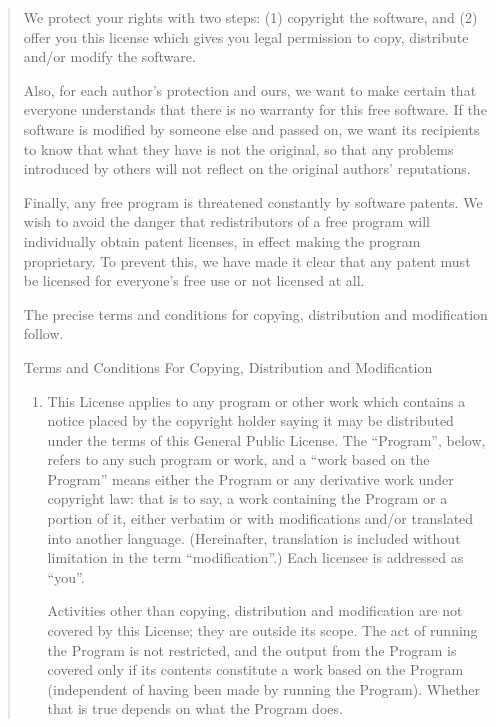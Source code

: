 \documentclass[twoside,11pt]{article}
\renewcommand{\_}{\texttt{\symbol{95}}}
\begin{document}
\begin{quote}
We protect your rights with two steps: (1) copyright the software, and (2)
offer you this license which gives you legal permission to copy,
distribute and/or modify the software.

Also, for each author's protection and ours, we want to make certain that
everyone understands that there is no warranty for this free software.  If
the software is modified by someone else and passed on, we want its
recipients to know that what they have is not the original, so that any
problems introduced by others will not reflect on the original authors'
reputations.

Finally, any free program is threatened constantly by software patents.
We wish to avoid the danger that redistributors of a free program will
individually obtain patent licenses, in effect making the program
proprietary.  To prevent this, we have made it clear that any patent must
be licensed for everyone's free use or not licensed at all.

The precise terms and conditions for copying, distribution and
modification follow.

\begin{center}
{\Large \sc Terms and Conditions For Copying, Distribution and
  Modification}
\end{center}

\begin{enumerate}

\addtocounter{enumi}{-1}

\item

This License applies to any program or other work which contains a notice
placed by the copyright holder saying it may be distributed under the
terms of this General Public License.  The ``Program'', below, refers to
any such program or work, and a ``work based on the Program'' means either
the Program or any derivative work under copyright law: that is to say, a
work containing the Program or a portion of it, either verbatim or with
modifications and/or translated into another language.  (Hereinafter,
translation is included without limitation in the term ``modification''.)
Each licensee is addressed as ``you''.

Activities other than copying, distribution and modification are not
covered by this License; they are outside its scope.  The act of
running the Program is not restricted, and the output from the Program
is covered only if its contents constitute a work based on the
Program (independent of having been made by running the Program).
Whether that is true depends on what the Program does.


\end{enumerate}
\end{quote}
\end{document}
